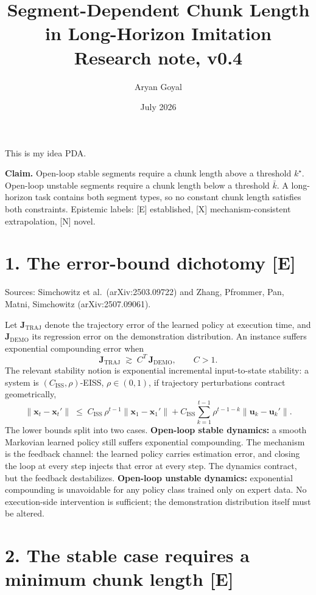 This is my idea PDA. \documentclass[11pt]{article}
\title{Segment-Dependent Chunk Length in Long-Horizon Imitation\\ \large Research note, v0.4}
\author{Aryan Goyal}
\date{July 2026}
\newcommand{\Jtraj}{\mathbf{J}_{\mathrm{TRAJ}}}
\newcommand{\Jdemo}{\mathbf{J}_{\mathrm{DEMO}}}
\newcommand{\Ciss}{C_{\mathrm{ISS}}}
\begin{document}
\maketitle

\noindent\textbf{Claim.} Open-loop stable segments require a chunk length above a threshold $k^\star$. Open-loop unstable segments require a chunk length below a threshold $\bar k$. A long-horizon task contains both segment types, so no constant chunk length satisfies both constraints. Epistemic labels: [E] established, [X] mechanism-consistent extrapolation, [N] novel.

\section*{1. The error-bound dichotomy [E]}

Sources: Simchowitz et al.\ (arXiv:2503.09722) and Zhang, Pfrommer, Pan, Matni, Simchowitz (arXiv:2507.09061).

Let $\Jtraj$ denote the trajectory error of the learned policy at execution time, and $\Jdemo$ its regression error on the demonstration distribution. An instance suffers exponential compounding error when
\begin{equation}
\Jtraj \;\gtrsim\; C^{T}\,\Jdemo, \qquad C>1.
\end{equation}
The relevant stability notion is exponential incremental input-to-state stability: a system is $(\Ciss,\rho)$-EISS, $\rho\in(0,1)$, if trajectory perturbations contract geometrically,
\begin{equation}
\|\mathbf{x}_t-\mathbf{x}_t'\| \;\leq\; \Ciss\,\rho^{t-1}\|\mathbf{x}_1-\mathbf{x}_1'\| + \Ciss\sum_{k=1}^{t-1}\rho^{t-1-k}\|\mathbf{u}_k-\mathbf{u}_k'\|.
\end{equation}
The lower bounds split into two cases. \textbf{Open-loop stable dynamics:} a smooth Markovian learned policy still suffers exponential compounding. The mechanism is the feedback channel: the learned policy carries estimation error, and closing the loop at every step injects that error at every step. The dynamics contract, but the feedback destabilizes. \textbf{Open-loop unstable dynamics:} exponential compounding is unavoidable for any policy class trained only on expert data. No execution-side intervention is sufficient; the demonstration distribution itself must be altered.

\section*{2. The stable case requires a minimum chunk length [E]}
\end{document}
